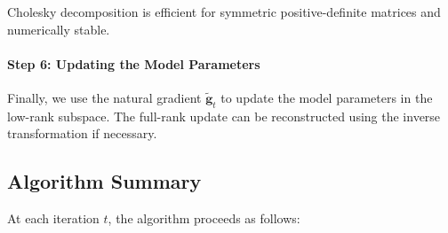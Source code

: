 Cholesky decomposition is efficient for symmetric positive-definite matrices and numerically stable.

\paragraph{Step 6: Updating the Model Parameters}



Finally, we use the natural gradient $\tilde{\mathbf{g}}_t$ to update the model parameters in the low-rank subspace. The full-rank update can be reconstructed using the inverse transformation if necessary.

\subsection{Algorithm Summary}

At each iteration $t$, the algorithm proceeds as follows:

